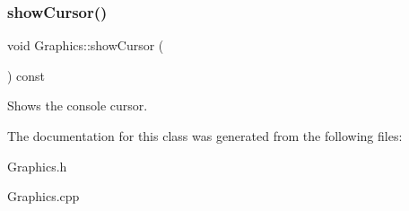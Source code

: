 \subsubsection{\texorpdfstring{showCursor()}{showCursor()}}
{\footnotesize\ttfamily void Graphics\+::show\+Cursor (\begin{DoxyParamCaption}{ }\end{DoxyParamCaption}) const}



Shows the console cursor. 



The documentation for this class was generated from the following files\+:\begin{DoxyCompactItemize}
\item 
Graphics.\+h\item 
Graphics.\+cpp\end{DoxyCompactItemize}
